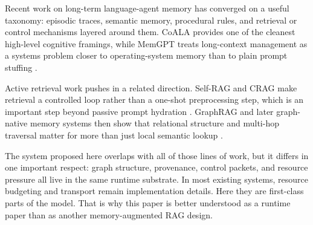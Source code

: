 Recent work on long-term language-agent memory has converged on a useful taxonomy: episodic traces, semantic memory, procedural rules, and retrieval or control mechanisms layered around them. CoALA provides one of the cleanest high-level cognitive framings, while MemGPT treats long-context management as a systems problem closer to operating-system memory than to plain prompt stuffing \citep{sumers2023coala,packer2023memgpt}.

Active retrieval work pushes in a related direction. Self-RAG and CRAG make retrieval a controlled loop rather than a one-shot preprocessing step, which is an important step beyond passive prompt hydration \citep{selfrag2023,crag2024}. GraphRAG and later graph-native memory systems then show that relational structure and multi-hop traversal matter for more than just local semantic lookup \citep{edge2024graphrag,hipporag2024,rasmussen2025zep}.

The system proposed here overlaps with all of those lines of work, but it differs in one important respect: graph structure, provenance, control packets, and resource pressure all live in the same runtime substrate. In most existing systems, resource budgeting and transport remain implementation details. Here they are first-class parts of the model. That is why this paper is better understood as a runtime paper than as another memory-augmented RAG design.
